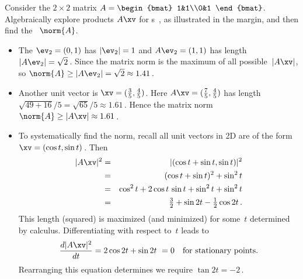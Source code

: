 \begin{example} 
Consider the \(2\times2\) matrix \(A=\begin{bmat} 1&1\\0&1 \end{bmat}\).
Algebraically explore products \(A\xv\) for s~\xv, as illustrated in the margin, 
and then find the ~\(\norm{A}\).
\begin{itemize}
\item The  \(\ev_2=(0,1)\) has \(|\ev_2|=1\) and \(A\ev_2=(1,1)\) has length \(|A\ev_2|=\sqrt2\)\,.
Since the matrix norm is the maximum of all possible~\(|A\xv|\), so \(\norm{A}\geq|A\ev_2|=\sqrt2\approx 1.41\)\,.
\item Another unit vector is \(\xv=(\tfrac35,\tfrac45)\).
Here \(A\xv=(\tfrac75,\tfrac45)\) has length \(\sqrt{49+16}/5=\sqrt{65}/5\approx1.61\)\,.
Hence the matrix norm \(\norm{A}\geq|A\xv|\approx 1.61\)\,.
\item To systematically find the norm, recall all unit vectors in 2D are of the form \(\xv=(\cos t,\sin t)\)\,.
Then
\begin{eqnarray*}
|A\xv|^2&=&|(\cos t+\sin t,\sin t)|^2
\\&=&(\cos t+\sin t)^2+\sin^2 t
\\&=&\cos^2 t+2\cos t\,\sin t+\sin^2t+\sin^2 t
\\&=&\tfrac32+\sin 2t-\tfrac12\cos 2t\,.
\end{eqnarray*}
This length (squared) is maximized (and minimized) for some~\(t\) determined by calculus.
Differentiating with respect to~\(t\)  leads to
\begin{equation*}
\frac{d|A\xv|^2}{dt}=2\cos2t+\sin 2t \ =0\quad\text{for stationary points.}
\end{equation*}
Rearranging this equation determines we require \(\tan 2t=-2\)\,.

\end{itemize}
\end{example}
